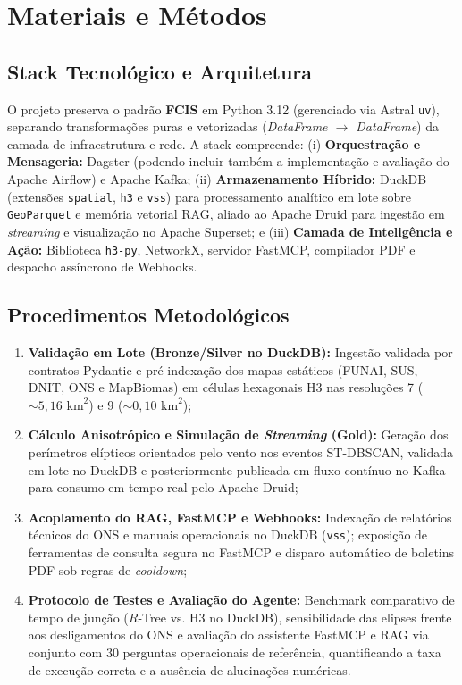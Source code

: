 \section{Materiais e Métodos}
\label{sc:materiais_e_metodos}

\subsection{Stack Tecnológico e Arquitetura}
O projeto preserva o padrão \textbf{FCIS} em Python 3.12 (gerenciado via Astral \texttt{uv}), separando transformações puras e vetorizadas (\textit{DataFrame $\rightarrow$ DataFrame}) da camada de infraestrutura e rede. A stack compreende: (i) \textbf{Orquestração e Mensageria:} Dagster (podendo incluir também a implementação e avaliação do Apache Airflow) e Apache Kafka; (ii) \textbf{Armazenamento Híbrido:} DuckDB (extensões \texttt{spatial}, \texttt{h3} e \texttt{vss}) para processamento analítico em lote sobre \texttt{GeoParquet} e memória vetorial RAG, aliado ao Apache Druid para ingestão em \textit{streaming} e visualização no Apache Superset; e (iii) \textbf{Camada de Inteligência e Ação:} Biblioteca \texttt{h3-py}, NetworkX, servidor FastMCP, compilador PDF e despacho assíncrono de Webhooks.

\subsection{Procedimentos Metodológicos}
\begin{enumerate}
    \item \textbf{Validação em Lote (Bronze/Silver no DuckDB):} Ingestão validada por contratos Pydantic e pré-indexação dos mapas estáticos (FUNAI, SUS, DNIT, ONS e MapBiomas) em células hexagonais H3 nas resoluções 7 ($\sim 5{,}16\text{ km}^2$) e 9 ($\sim 0{,}10\text{ km}^2$);
    \item \textbf{Cálculo Anisotrópico e Simulação de \textit{Streaming} (Gold):} Geração dos perímetros elípticos orientados pelo vento nos eventos ST-DBSCAN, validada em lote no DuckDB e posteriormente publicada em fluxo contínuo no Kafka para consumo em tempo real pelo Apache Druid;
    \item \textbf{Acoplamento do RAG, FastMCP e Webhooks:} Indexação de relatórios técnicos do ONS e manuais operacionais no DuckDB (\texttt{vss}); exposição de ferramentas de consulta segura no FastMCP e disparo automático de boletins PDF sob regras de \textit{cooldown};
    \item \textbf{Protocolo de Testes e Avaliação do Agente:} Benchmark comparativo de tempo de junção ($R$-Tree vs. H3 no DuckDB), sensibilidade das elipses frente aos desligamentos do ONS e avaliação do assistente FastMCP e RAG via conjunto com 30 perguntas operacionais de referência, quantificando a taxa de execução correta e a ausência de alucinações numéricas.
\end{enumerate}
